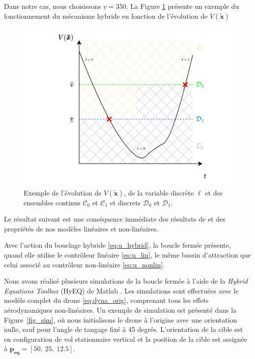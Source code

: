 Dans notre cas, nous choisissons $\underline{v}= 350$. La Figure \ref*{fig:ensembletrnaistion} présente un exemple du fonctionnement du mécanisme hybride en fonction de l'évolution de $V(\boldsymbol{\tilde x})$

\begin{figure}[ht!]
  \centering
  \includegraphics[trim=0cm 0cm 0cm 0cm,clip,width=0.8\columnwidth]{figures/transition.png}
  \caption{Exemple de l'évolution de $V(\boldsymbol{\tilde x})$, de la variable discrète $\ell$ et des ensembles continus $\mathcal{C}_{0}$ et $ \mathcal{C}_{1}$ et discrets $\mathcal{D}_{0}$ et $\mathcal{D}_{1}$.}
  \label{fig:ensembletrnaistion}
\end{figure}

Le résultat suivant est une conséquence immédiate des résultats de \cite[Ex. 1.7]{65} et des propriétés de nos modèles linéaires et non-linéaires.

\begin{proposition}
    Avec l'action du bouclage hybride \eqref{eq:u_hybrid}, la boucle fermée présente, quand elle utilise le contrôleur linéaire \eqref{eq:u_lin}, le même bassin d'attraction que celui associé au contrôleur non-linéaire \eqref{eq:u_nonlin}.
\end{proposition}

Nous avons réalisé plusieurs simulations de la boucle fermée à l'aide de la \textit{Hybrid Equations Toolbox} (HyEQ) de Matlab \cite{sanfelice_2017}. Les simulations sont effectuées avec le modèle complet du drone \eqref{eq:dyna_orig}, comprenant tous les effets aérodynamiques non-linéaires. Un exemple de simulation est présenté dans la Figure~\ref{fig_sim}, où nous initialisons le drone à l'origine avec une orientation nulle, sauf pour l'angle de tangage fixé à 45 degrés. L'orientation de la cible est en configuration de vol stationnaire vertical et la position de la cible est assignée à $\boldsymbol{p_{\text{eq}}} = [50,~25,~12.5]$.

